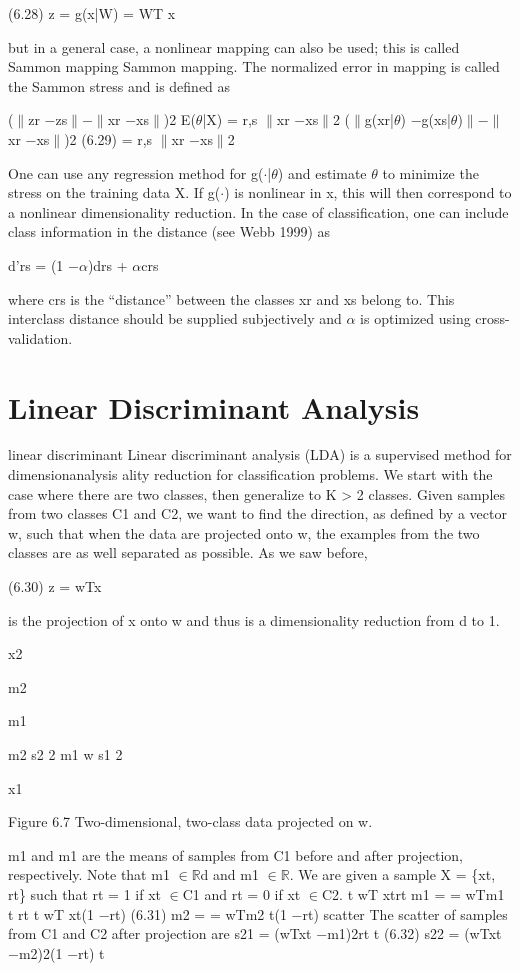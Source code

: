 (6.28) z = g(x|W) = WT x

but in a general case, a nonlinear mapping can also be used; this is called Sammon mapping Sammon mapping. The normalized error in mapping is called the Sammon stress and is defined as

($\parallel$zr $-$zs$\parallel$$-$$\parallel$xr $-$xs$\parallel$)2 E($\theta$|X) = r,s $\parallel$xr $-$xs$\parallel$2 ($\parallel$g(xr|$\theta$) $-$g(xs|$\theta$)$\parallel$$-$$\parallel$xr $-$xs$\parallel$)2 (6.29) = r,s $\parallel$xr $-$xs$\parallel$2

One can use any regression method for g($\cdot$|$\theta$) and estimate $\theta$ to minimize the stress on the training data X. If g($\cdot$) is nonlinear in x, this will then correspond to a nonlinear dimensionality reduction. In the case of classification, one can include class information in the distance (see Webb 1999) as

d'rs = (1 $-$$\alpha$)drs + $\alpha$crs

where crs is the “distance” between the classes xr and xs belong to. This interclass distance should be supplied subjectively and $\alpha$ is optimized using cross-validation.

\section{Linear Discriminant Analysis}

linear discriminant Linear discriminant analysis (LDA) is a supervised method for dimensionanalysis ality reduction for classification problems. We start with the case where there are two classes, then generalize to K > 2 classes. Given samples from two classes C1 and C2, we want to find the direction, as defined by a vector w, such that when the data are projected onto w, the examples from the two classes are as well separated as possible. As we saw before,

(6.30) z = wTx

is the projection of x onto w and thus is a dimensionality reduction from d to 1.

x2

m2

m1

m2 s2 2 m1 w s1 2

x1

Figure 6.7 Two-dimensional, two-class data projected on w.

m1 and m1 are the means of samples from C1 before and after projection, respectively. Note that m1 $\in$$\mathbb{R}$d and m1 $\in$$\mathbb{R}$. We are given a sample X = \{xt, rt\} such that rt = 1 if xt $\in$C1 and rt = 0 if xt $\in$C2. t wT xtrt m1 = = wTm1 t rt t wT xt(1 $-$rt) (6.31) m2 = = wTm2 t(1 $-$rt) scatter The scatter of samples from C1 and C2 after projection are s21 = (wTxt $-$m1)2rt t (6.32) s22 = (wTxt $-$m2)2(1 $-$rt) t

